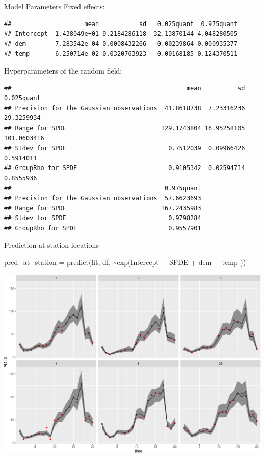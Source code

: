 \documentclass[
  ignorenonframetext,
]{beamer}
\newenvironment{Shaded}{\begin{snugshade}}{\end{snugshade}}
\newcommand{\FunctionTok}[1]{\textcolor[rgb]{0.00,0.00,0.00}{#1}}
\newcommand{\NormalTok}[1]{#1}
\newcommand{\OtherTok}[1]{\textcolor[rgb]{0.56,0.35,0.01}{#1}}
\newcommand{\SpecialCharTok}[1]{\textcolor[rgb]{0.00,0.00,0.00}{#1}}
\begin{document}
\begin{frame}[fragile]{Model Parameters}
\protect\hypertarget{model-parameters}{}
Fixed effects: \tiny

\begin{verbatim}
##                    mean           sd   0.025quant  0.975quant
## Intercept -1.438049e+01 9.2184286118 -32.13870144 4.048280505
## dem       -7.283542e-04 0.0008432266  -0.00239864 0.000935377
## temp       6.250714e-02 0.0320763923  -0.00168185 0.124370511
\end{verbatim}

\normalsize

Hyperparameters of the random field: \tiny

\begin{verbatim}
##                                                mean          sd  0.025quant
## Precision for the Gaussian observations  41.8618738  7.23316236  29.3259934
## Range for SPDE                          129.1743804 16.95258105 101.0603416
## Stdev for SPDE                            0.7512039  0.09966426   0.5914011
## GroupRho for SPDE                         0.9105342  0.02594714   0.8555936
##                                          0.975quant
## Precision for the Gaussian observations  57.6623693
## Range for SPDE                          167.2435983
## Stdev for SPDE                            0.9798284
## GroupRho for SPDE                         0.9557901
\end{verbatim}
\end{frame}

\begin{frame}[fragile]{Prediction at station locations}
\protect\hypertarget{prediction-at-station-locations}{}
\small

\begin{Shaded}
\begin{Highlighting}[]
\NormalTok{pred\_at\_station }\OtherTok{=} \FunctionTok{predict}\NormalTok{(fit, df, }
                          \SpecialCharTok{\textasciitilde{}}\FunctionTok{exp}\NormalTok{(Intercept }\SpecialCharTok{+}\NormalTok{ SPDE }\SpecialCharTok{+}\NormalTok{ dem }\SpecialCharTok{+}\NormalTok{ temp ))}
\end{Highlighting}
\end{Shaded}

\normalsize

\begin{center}\includegraphics[width=0.7\linewidth]{Part3_Spatial_files/figure-beamer/unnamed-chunk-32-1} \end{center}
\end{frame}
\end{document}
